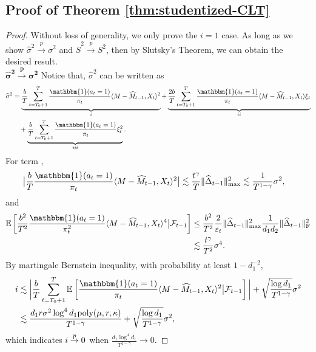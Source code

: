 \documentclass[12pt]{article}
\newcommand\fro[1]{\| #1 \|_{\rm{F}}}
\newcommand{\inp}[2]{\langle #1,#2\rangle}
\def\EE{{\mathbb E}}
\theoremstyle{plain}
\begin{document}
\subsection{Proof of Theorem \ref{thm:studentized-CLT}}
\begin{proof}
    Without loss of generality, we only prove the $i=1$ case. As long as we show $\widehat{\sigma}^2\overset{p}{\rightarrow} \sigma^2$ and $\widehat{S}^2\overset{p}{\rightarrow} S^2$, then by Slutsky's Theorem, we can obtain the desired result. \\
    $\mathbf{\widehat{\sigma}^2\overset{p}{\rightarrow} \sigma^2}$ \quad Notice that, $\widehat{\sigma}^2$ can be written as
    \begin{align*}
        \widehat{\sigma}^2&= \underbrace{\frac{b}{T}\sum_{t=T_0+1}^{T} \frac{\mathbbm{1}(a_t=1)}{\pi_t}\inp{M-\widehat{M}_{t-1}}{X_t}^2}_{\uppercase\expandafter{\romannumeral1}} + \underbrace{\frac{2b}{T}\sum_{t=T_0+1}^{T} \frac{\mathbbm{1}(a_t=1)}{\pi_t} \inp{M-\widehat{M}_{t-1}}{X_t}\xi_t}_{\uppercase\expandafter{\romannumeral2}} \\ &\quad + \underbrace{\frac{b}{T}\sum_{t=T_0+1}^{T} \frac{\mathbbm{1}(a_t=1)}{\pi_t} \xi_t^2}_{\uppercase\expandafter{\romannumeral3}}.
    \end{align*}
    For term \uppercase\expandafter{}, 
    \begin{align*}
        \big|\frac{b}{T} \frac{\mathbbm{1}(a_t=1)}{\pi_t}\inp{M-\widehat{M}_{t-1}}{X_t}^2\big|&\lesssim \frac{t^\gamma}{T}\|\widehat{\Delta}_{t-1}\|_{\max}^2 \lesssim \frac{1}{T^{1-\gamma}}\sigma^2, 
    \end{align*}
    and 
    \begin{align*}
        \EE\left[\frac{b^2}{T^2} \frac{\mathbbm{1}(a_t=1)}{\pi_t^2}\inp{M-\widehat{M}_{t-1}}{X_t}^4\big|\mathcal{F}_{t-1}\right]&\leq \frac{b^2}{T^2}\frac{2}{\varepsilon_t}\|\widehat{\Delta}_{t-1}\|_{\max}^2\frac{1}{d_1d_2}\fro{\widehat{\Delta}_{t-1}}^2 \\
        &\lesssim \frac{t^\gamma}{T^2}\sigma^4.
    \end{align*}
    By martingale Bernstein inequality, with probability at least $1-d_1^{-2}$,
    \begin{align*}
        \uppercase\expandafter{\romannumeral1}&\lesssim \bigg|\frac{b}{T}\sum_{t=T_0+1}^{T} \EE\left[\frac{\mathbbm{1}(a_t=1)}{\pi_t}\inp{M-\widehat{M}_{t-1}}{X_t}^2\big|\mathcal{F}_{t-1}\right]\bigg| + \sqrt{\frac{\log d_1}{T^{1-\gamma}}}\sigma^2 \\
        &\lesssim \frac{d_1r\sigma^2\log^4 d_1\text{poly}(\mu,r,\kappa)}{T^{1-\gamma}} + \sqrt{\frac{\log d_1}{T^{1-\gamma}}}\sigma^2,
    \end{align*}
    which indicates $\uppercase\expandafter{\romannumeral1}\overset{p}{\rightarrow} 0$ when $\frac{d_1\log^4 d_1}{T^{1-\gamma}}\rightarrow 0$. 
    

\end{proof}
\end{document}
